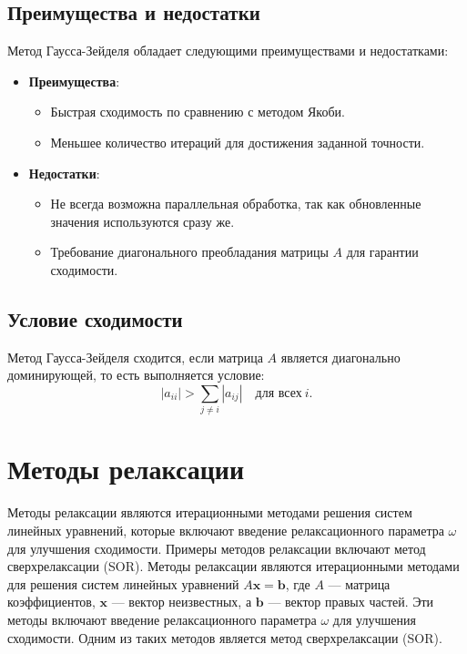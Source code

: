\documentclass{article}
\begin{document}
\subsection*{Преимущества и недостатки}

Метод Гаусса-Зейделя обладает следующими преимуществами и недостатками:

\begin{itemize}
    \item \textbf{Преимущества}:
    \begin{itemize}
        \item Быстрая сходимость по сравнению с методом Якоби.
        \item Меньшее количество итераций для достижения заданной точности.
    \end{itemize}
    \item \textbf{Недостатки}:
    \begin{itemize}
        \item Не всегда возможна параллельная обработка, так как обновленные значения используются сразу же.
        \item Требование диагонального преобладания матрицы \(A\) для гарантии сходимости.
    \end{itemize}
\end{itemize}

\subsection*{Условие сходимости}

Метод Гаусса-Зейделя сходится, если матрица \(A\) является диагонально доминирующей, то есть выполняется условие:
\[
|a_{ii}| > \sum_{j \neq i} |a_{ij}| \quad \text{для всех} \ i.
\]
\section{Методы релаксации}
Методы релаксации являются итерационными методами решения систем линейных уравнений, которые включают введение релаксационного параметра $\omega$ для улучшения сходимости. Примеры методов релаксации включают метод сверхрелаксации (SOR).
Методы релаксации являются итерационными методами для решения систем линейных уравнений \(A\mathbf{x} = \mathbf{b}\), где \(A\) — матрица коэффициентов, \(\mathbf{x}\) — вектор неизвестных, а \(\mathbf{b}\) — вектор правых частей. Эти методы включают введение релаксационного параметра \(\omega\) для улучшения сходимости. Одним из таких методов является метод сверхрелаксации (SOR).
\end{document}

